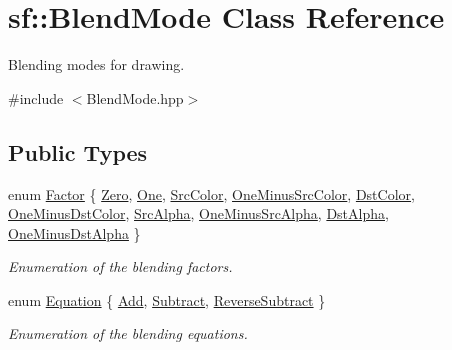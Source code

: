 \hypertarget{structsf_1_1_blend_mode}{}\section{sf\+:\+:Blend\+Mode Class Reference}
\label{structsf_1_1_blend_mode}


Blending modes for drawing.  




{\ttfamily \#include $<$Blend\+Mode.\+hpp$>$}

\subsection*{Public Types}
\begin{DoxyCompactItemize}
\item 
enum \hyperlink{structsf_1_1_blend_mode_afb9852caf356b53bb0de460c58a9ebbb}{Factor} \{ \newline
\hyperlink{structsf_1_1_blend_mode_afb9852caf356b53bb0de460c58a9ebbbafda2d66c3c3da15cd3b42338fbf6d2ba}{Zero}, 
\hyperlink{structsf_1_1_blend_mode_afb9852caf356b53bb0de460c58a9ebbbaa2d3ba8b8bb2233c9d357cbb94bf4181}{One}, 
\hyperlink{structsf_1_1_blend_mode_afb9852caf356b53bb0de460c58a9ebbbad679bb0ecaf15c188d7f2e1fab572188}{Src\+Color}, 
\hyperlink{structsf_1_1_blend_mode_afb9852caf356b53bb0de460c58a9ebbba5971ffdbca63382058ccba76bfce219e}{One\+Minus\+Src\+Color}, 
\newline
\hyperlink{structsf_1_1_blend_mode_afb9852caf356b53bb0de460c58a9ebbba3d85281c3eab7153f2bd9faae3e7523a}{Dst\+Color}, 
\hyperlink{structsf_1_1_blend_mode_afb9852caf356b53bb0de460c58a9ebbbac8198db20d14506a841d1091ced1cae2}{One\+Minus\+Dst\+Color}, 
\hyperlink{structsf_1_1_blend_mode_afb9852caf356b53bb0de460c58a9ebbbaac0ae68df2930b4d616c3e7abeec7d41}{Src\+Alpha}, 
\hyperlink{structsf_1_1_blend_mode_afb9852caf356b53bb0de460c58a9ebbbaab57e8616bf4c21d8ee923178acdf2c8}{One\+Minus\+Src\+Alpha}, 
\newline
\hyperlink{structsf_1_1_blend_mode_afb9852caf356b53bb0de460c58a9ebbba5e3dc9a6f117aaa5f7433e1f4662a5f7}{Dst\+Alpha}, 
\hyperlink{structsf_1_1_blend_mode_afb9852caf356b53bb0de460c58a9ebbbab4e5c63f189f26075e5939ad1a2ce4e4}{One\+Minus\+Dst\+Alpha}
 \}\begin{DoxyCompactList}\small\item\em Enumeration of the blending factors. \end{DoxyCompactList}
\item 
enum \hyperlink{structsf_1_1_blend_mode_a7bce470e2e384c4f9c8d9595faef7c32}{Equation} \{ \hyperlink{structsf_1_1_blend_mode_a7bce470e2e384c4f9c8d9595faef7c32a50c081d8f36cf7b77632966e15d38966}{Add}, 
\hyperlink{structsf_1_1_blend_mode_a7bce470e2e384c4f9c8d9595faef7c32a14c825be24f8412fc5ed5b49f19bc0d0}{Subtract}, 
\hyperlink{structsf_1_1_blend_mode_a7bce470e2e384c4f9c8d9595faef7c32a2d04acf59e91811128e7d0ef076f65f0}{Reverse\+Subtract}
 \}\begin{DoxyCompactList}\small\item\em Enumeration of the blending equations. \end{DoxyCompactList}
\end{DoxyCompactItemize}
